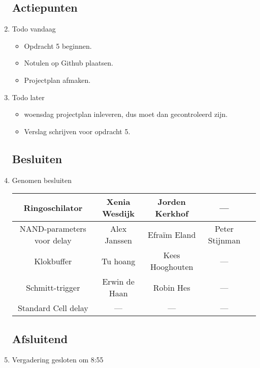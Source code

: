 \documentclass{article}
\begin{document}
\begin{enumerate}
	\subsection*{Actiepunten}
	\item Todo vandaag
	\begin{itemize}
		\item Opdracht 5 beginnen.
		\item Notulen op Github plaatsen.
		\item Projectplan afmaken.
	\end{itemize}
	\item Todo later
	\begin{itemize}
		\item woensdag projectplan inleveren, dus moet dan gecontroleerd zijn.
		\item Verslag schrijven voor opdracht 5.
	\end{itemize}

	\subsection*{Besluiten}
	\item Genomen besluiten
	\begin{center}
	\begin{tabular}{|c |c | c| c| c|}
	\hline
	Ringoschilator & Xenia Wesdijk & Jorden Kerkhof & ---\\
	\hline
	NAND-parameters voor delay & Alex Janssen & Efraïm Eland & Peter Stijnman\\
	\hline
	Klokbuffer &  Tu hoang & Kees Hooghouten & --- \\
	\hline
	Schmitt-trigger & Erwin de Haan & Robin Hes & ---\\
	\hline
	Standard Cell delay & --- & --- & --- \\
	\hline
	\end{tabular}
	\end{center}

	\noindent 
	\subsection*{Afsluitend}
	\item Vergadering gesloten om 8:55 %

\end{enumerate}
\end{document}
